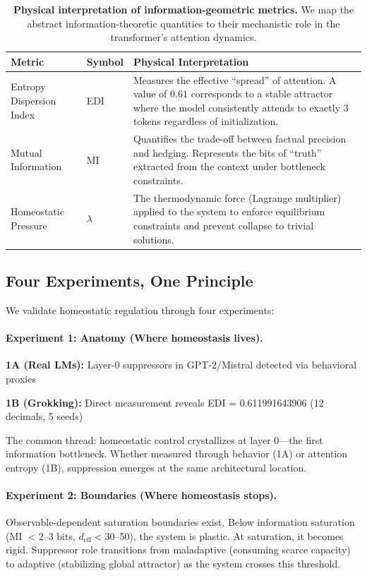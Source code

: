 \begin{table}[t]
    \centering
    \caption{\textbf{Physical interpretation of information-geometric metrics.} We map the abstract information-theoretic quantities to their mechanistic role in the transformer's attention dynamics.}
    \label{tab:metric_map}
    \begin{tabular}{@{}llp{8cm}@{}}
    \toprule
    \textbf{Metric} & \textbf{Symbol} & \textbf{Physical Interpretation} \\ \midrule
    Entropy Dispersion Index & EDI & Measures the effective ``spread'' of attention. A value of $0.61$ corresponds to a stable attractor where the model consistently attends to exactly 3 tokens regardless of initialization. \\ \addlinespace
    Mutual Information & MI & Quantifies the trade-off between factual precision and hedging. Represents the bits of ``truth'' extracted from the context under bottleneck constraints. \\ \addlinespace
    Homeostatic Pressure & $\lambda$ & The thermodynamic force (Lagrange multiplier) applied to the system to enforce equilibrium constraints and prevent collapse to trivial solutions. \\ \bottomrule
    \end{tabular}
\end{table}

\subsection{Four Experiments, One Principle}

We validate homeostatic regulation through four experiments:

\paragraph{Experiment 1: Anatomy (Where homeostasis lives).}
\textbf{1A (Real LMs):} Layer-0 suppressors in GPT-2/Mistral detected via behavioral proxies

\textbf{1B (Grokking):} Direct measurement reveals EDI = 0.611991643906 (12 decimals, 5 seeds)

The common thread: homeostatic control crystallizes at layer 0—the first information bottleneck. Whether measured through behavior (1A) or attention entropy (1B), suppression emerges at the same architectural location.

\paragraph{Experiment 2: Boundaries (Where homeostasis stops).}
Observable-dependent saturation boundaries exist. Below information saturation (MI $< 2$--3 bits, $d_{\text{eff}} < 30$--50), the system is plastic. At saturation, it becomes rigid. Suppressor role transitions from maladaptive (consuming scarce capacity) to adaptive (stabilizing global attractor) as the system crosses this threshold.

